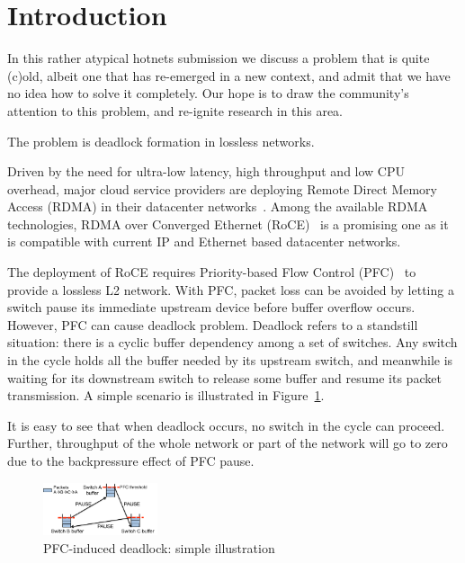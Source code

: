 \secspace
\section{Introduction}
\secspace
\label{sec:intro}

In this rather atypical hotnets submission we discuss a problem that is quite
(c)old, albeit one that has re-emerged in a new context, and admit that we have
no idea how to solve it completely. Our hope is to draw the community's
attention to this problem, and re-ignite research in this area.

The problem is deadlock formation in lossless networks.

Driven by the need for ultra-low latency, high throughput and low CPU overhead,
major cloud service providers are deploying Remote Direct Memory Access (RDMA) in
their datacenter networks~\cite{dcqcn,timely}. Among the
available RDMA technologies,  RDMA over Converged Ethernet (RoCE)~\cite{roce} is
a promising one as it is compatible with current IP and Ethernet based
datacenter networks.

The deployment of RoCE requires Priority-based Flow Control (PFC)~\cite{pfc} to
provide a lossless L2 network. With PFC, packet loss can be avoided by letting a
switch pause its immediate upstream device before buffer overflow occurs.
However, PFC can cause deadlock problem. Deadlock refers to a
standstill situation: there is a cyclic buffer dependency among a set of
switches. Any switch in the cycle holds all the buffer needed by its upstream
switch, and meanwhile is waiting for its downstream switch to release some
buffer and resume its packet transmission. A simple scenario is illustrated in
Figure~\ref{fig:deadlock_example}.

It is easy to see that when deadlock occurs, no switch in the cycle can proceed. Further, throughput of the whole network
or part of the network will go to zero due to the backpressure
effect of PFC pause.

\begin{figure}
	\centering
	\includegraphics[width=0.3\textwidth] {figs/deadlock}
	\vspace{-0.15in}
	\caption{PFC-induced deadlock: simple illustration}
	\vspace{-0.25in}
	\label{fig:deadlock_example}
\end{figure}

